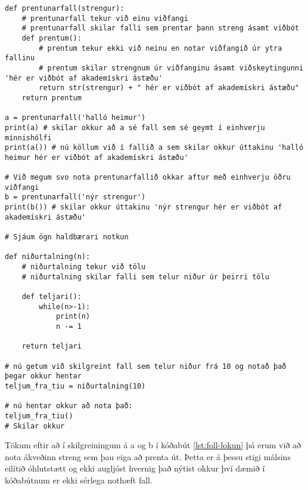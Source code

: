 \begin{lstlisting}[caption=Lokun kynnt, label=lst:foll-lokun]
def prentunarfall(strengur):
	# prentunarfall tekur við einu viðfangi
	# prentunarfall skilar falli sem prentar þann streng ásamt viðbót
	def prentum():
		# prentum tekur ekki við neinu en notar viðfangið úr ytra fallinu
		# prentum skilar strengnum úr viðfanginu ásamt viðskeytingunni 'hér er viðbót af akademískri ástæðu'
		return str(strengur) + " hér er viðbót af akademískri ástæðu"
	return prentum

a = prentunarfall('halló heimur')
print(a) # skilar okkur að a sé fall sem sé geymt í einhverju minnishólfi
print(a()) # nú köllum við í fallið a sem skilar okkur úttakinu 'halló heimur hér er viðbót af akademískri ástæðu'

# Við megum svo nota prentunarfallið okkar aftur með einhverju öðru viðfangi
b = prentunarfall('nýr strengur')
print(b()) # skilar okkur úttakinu 'nýr strengur hér er viðbót af akademískri ástæðu'

# Sjáum ögn haldbærari notkun

def niðurtalning(n):
	# niðurtalning tekur við tölu
	# niðurtalning skilar falli sem telur niður úr þeirri tölu
	
	def teljari():
		while(n>-1):
			print(n)
			n -= 1
	
	return teljari
	
# nú getum við skilgreint fall sem telur niður frá 10 og notað það þegar okkur hentar
teljum_fra_tiu = niðurtalning(10)

# nú hentar okkur að nota það:
teljum_fra_tiu()
# Skilar okkur
\end{lstlisting}

Tökum eftir að í skilgreiningum á a og b í kóðabút \ref{lst:foll-lokun} þá erum við að nota ákveðinn streng sem þau eiga að prenta út.
Þetta er á þessu stigi málsins eilítið óhlutstætt og ekki augljóst hvernig það nýtist okkur því dæmið í kóðabútnum er ekki sérlega nothæft fall.